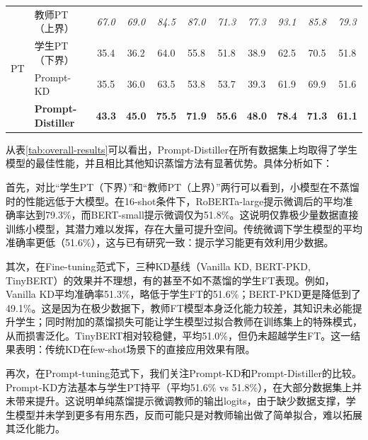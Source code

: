\documentclass[../main.tex]{subfiles}
\begin{document}
\begin{table}
\begin{tabular}{c|l|*{8}{c}|c}
		\midrule[0.5pt]
		\multirow{4}{*}{PT}
		            & 教师PT（上界）                                                & \textit{67.0} & \textit{69.0}    & \textit{84.5} & \textit{87.0} & \textit{71.3} & \textit{77.3} & \textit{93.1}  & \textit{85.8} & \textit{79.3} \\
		            & 学生PT（下界）                                                & 35.4          & 36.2             & 64.0          & 55.8          & 51.8          & 38.9          & 62.5           & 70.5          & 51.8          \\
		\cline{2-11}
		            & Prompt-KD                                               & 35.5          & 36.0             & 63.5          & 53.8          & 53.7          & 39.3          & 61.9           & 69.9          & 51.6          \\
		\cline{2-11}
		            & \textbf{Prompt-Distiller}                               & \textbf{43.3} & \textbf{45.0}    & \textbf{75.5} & \textbf{71.9} & \textbf{55.6} & \textbf{48.0} & \textbf{78.4}  & \textbf{71.3} & \textbf{61.1} \\
		\bottomrule[1pt]
	\end{tabular}
\end{table}

从表\ref{tab:overall-results}可以看出，Prompt-Distiller在所有数据集上均取得了学生模型的最佳性能，并且相比其他知识蒸馏方法有显著优势。具体分析如下：

首先，对比“学生PT（下界）”和“教师PT（上界）”两行可以看到，小模型在不蒸馏时的性能远低于大模型。在16-shot条件下，RoBERTa-large提示微调后的平均准确率达到79.3\%，而BERT-small提示微调仅为51.8\%。这说明仅靠极少量数据直接训练小模型，其潜力难以发挥，存在大量可提升空间。传统微调下学生模型的平均准确率更低（51.6\%），这与已有研究一致：提示学习能更有效利用少数据。

其次，在Fine-tuning范式下，三种KD基线（Vanilla KD, BERT-PKD, TinyBERT）的效果并不理想，有的甚至不如不蒸馏的学生FT表现。例如，Vanilla KD平均准确率51.3\%，略低于学生FT的51.6\%；BERT-PKD更是降低到了49.1\%。这是因为在极少数据下，教师FT模型本身泛化能力较差，其知识未必能提升学生；同时附加的蒸馏损失可能让学生模型过拟合教师在训练集上的特殊模式，从而损害泛化。TinyBERT相对较稳健，平均51.0\%，但仍未超越学生FT。这一结果表明：传统KD在few-shot场景下的直接应用效果有限。

再次，在Prompt-tuning范式下，我们关注Prompt-KD和Prompt-Distiller的比较。Prompt-KD方法基本与学生PT持平（平均51.6\% vs 51.8\%），在大部分数据集上并未带来提升。这说明单纯蒸馏提示微调教师的输出logits，由于缺少数据支撑，学生模型并未学到更多有用东西，反而可能只是对教师输出做了简单拟合，难以拓展其泛化能力。
\end{document}

